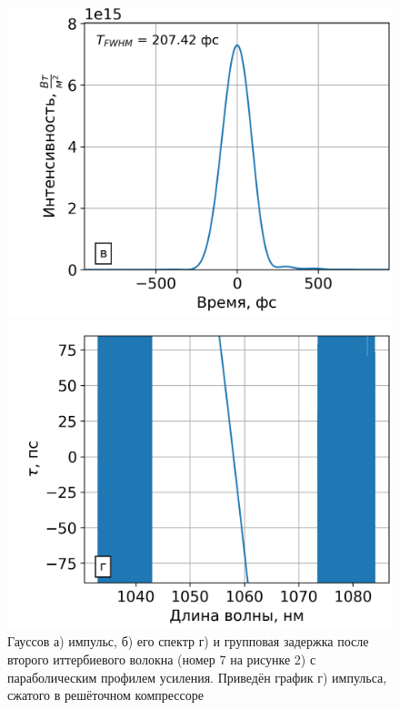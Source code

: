 \documentclass[12pt]{article}
\begin{document}
\begin{figure}[h!]
\begin{minipage}[b]{0.5\textwidth}
  \end{minipage}

  \vspace{}

  \begin{minipage}[b]{0.5\textwidth}
    \includegraphics[width=\linewidth]{Images/Gauss Pulse Parabolic Profile/После компрессора/14 элемент gamma=49.60634 l_g=0.37317 сжатие}
  \end{minipage}%
  \begin{minipage}[b]{0.5\textwidth}
    \includegraphics[width=\linewidth]{Images/Gauss Pulse Parabolic Profile/Импульс и спектр/!14. Yb3+ 6_125, 0.8m_time_delay}
  \end{minipage}

  \caption{Гауссов а) импульс, б) его спектр г) и групповая задержка после второго иттербиевого волокна (номер 7 на
  рисунке 2) с параболическим профилем усиления. Приведён график г) импульса, сжатого в решёточном компрессоре}
  \label{fig:both}
\end{figure}
\end{document}
